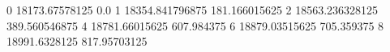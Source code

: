 0 18173.67578125 0.0
1 18354.841796875 181.166015625
2 18563.236328125 389.560546875
4 18781.66015625 607.984375
6 18879.03515625 705.359375
8 18991.6328125 817.95703125
